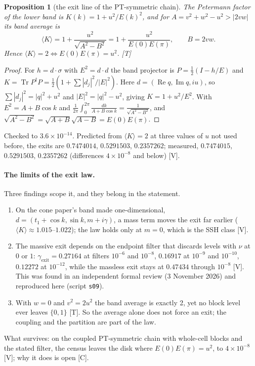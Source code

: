 \documentclass[11pt]{article}
\newtheorem{proposition}[theorem]{Proposition}
\theoremstyle{definition}
\newcommand{\grade}[1]{\textsf{\small[#1]}}
\newcommand{\Tr}{\operatorname{Tr}}
\begin{document}
\begin{proposition}[the exit line of the PT-symmetric chain]
The Petermann factor of the lower band is $K(k)=1+u^2/E(k)^2$, and for $A=v^2+w^2-u^2>|2vw|$ its band average is
\[
\langle K\rangle=1+\frac{u^2}{\sqrt{A^2-B^2}}=1+\frac{u^2}{E(0)E(\pi)},\qquad B=2vw.
\]
Hence $\langle K\rangle=2\iff E(0)E(\pi)=u^2$. \grade{T}
\end{proposition}
\begin{proof}
For $h=d\cdot\sigma$ with $E^2=d\cdot d$ the band projector is $P=\tfrac12(I-h/E)$ and $K=\Tr P^\dagger P=\tfrac12(1+\sum|d_j|^2/|E|^2)$. Here $d=(\operatorname{Re}q,\operatorname{Im}q,iu)$, so $\sum|d_j|^2=|q|^2+u^2$ and $|E|^2=|q|^2-u^2$, giving $K=1+u^2/E^2$. With $E^2=A+B\cos k$ and $\frac1{2\pi}\int_0^{2\pi}\frac{dk}{A+B\cos k}=\frac1{\sqrt{A^2-B^2}}$, and $\sqrt{A^2-B^2}=\sqrt{A+B}\sqrt{A-B}=E(0)E(\pi)$.
\end{proof}
Checked to $3.6\times10^{-14}$. Predicted from $\langle K\rangle=2$ at three values of $u$ not used before, the exits are $0.7474014$, $0.5291503$, $0.2357262$; measured, $0.7474015$, $0.5291503$, $0.2357262$ (differences $4\times10^{-8}$ and below) \grade{V}.

\paragraph{The limits of the exit law.} Three findings scope it, and they belong in the statement.
\begin{enumerate}
\item On the cone paper's band made one-dimensional, $d=(t_1+\cos k,\sin k,m+i\gamma)$, a mass term moves the exit far earlier ($\langle K\rangle\approx1.015$–$1.022$); the law holds only at $m=0$, which is the SSH class \grade{V}.
\item The massive exit depends on the endpoint filter that discards levels with $\nu$ at $0$ or $1$: $\gamma_{\mathrm{exit}}=0.27164$ at filters $10^{-6}$ and $10^{-8}$, $0.16917$ at $10^{-9}$ and $10^{-10}$, $0.12272$ at $10^{-12}$, while the massless exit stays at $0.47434$ through $10^{-8}$ \grade{V}. This was found in an independent formal review (3 November 2026) and reproduced here (script \texttt{s09}).
\item With $w=0$ and $v^2=2u^2$ the band average is exactly 2, yet no block level ever leaves $\{0,1\}$ \grade{T}. So the average alone does not force an exit; the coupling and the partition are part of the law.
\end{enumerate}
What survives: on the coupled PT-symmetric chain with whole-cell blocks and the stated filter, the census leaves the disk where $E(0)E(\pi)=u^2$, to $4\times10^{-8}$ \grade{V}; why it does is open \grade{C}.
\end{document}
